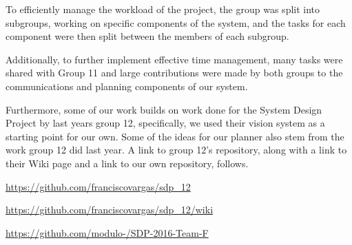 ﻿\documentclass[12pt,a4paper,titlepage]{article}
\begin{document}
To efficiently manage the workload of the project, the group was split into subgroups, working on specific components of the system, and the tasks for each component were then split between the members of each subgroup. 

Additionally, to further implement effective time management, many tasks were shared with Group 11 and large contributions were made by both groups to the communications and planning components of our system.

Furthermore, some of our work builds on work done for the System Design Project by last years group 12, specifically, we used their vision system as a starting point for our own. Some of the ideas for our planner also stem from the work group 12 did last year.
A link to group 12's repository, along with a link to their Wiki page and a link to our own repository, follows.

\url{https://github.com/franciscovargas/sdp_12}

\url{https://github.com/franciscovargas/sdp_12/wiki}

\url{https://github.com/modulo-/SDP-2016-Team-F}

%
%
%
%
%
\end{document}
